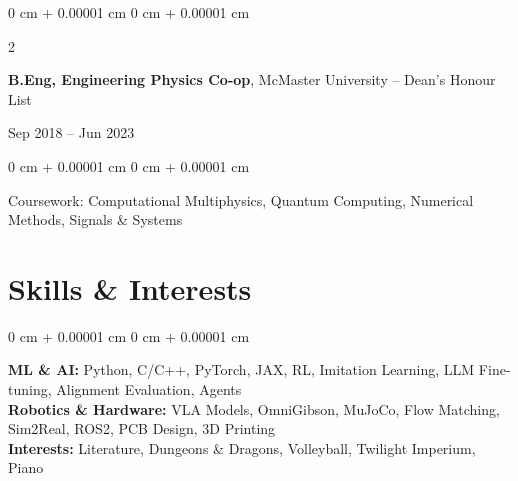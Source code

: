 \documentclass[10pt, letterpaper]{article}
\newenvironment{onecolentry}{
    \begin{adjustwidth}{
        0 cm + 0.00001 cm
    }{
        0 cm + 0.00001 cm
    }
}{
    \end{adjustwidth}
} %
\newenvironment{twocolentry}[2][]{
    \onecolentry
    \def\secondColumn{#2}
    \setcolumnwidth{\fill, 4.5 cm}
    \begin{paracol}{2}
}{
    \switchcolumn \raggedleft \secondColumn
    \end{paracol}
    \endonecolentry
} %
\begin{document}
    \vspace{0.2 cm}
    \begin{twocolentry}{Sep 2018 – Jun 2023}
        \textbf{B.Eng, Engineering Physics Co-op}, McMaster University -- Dean's Honour List
    \end{twocolentry}
    \begin{onecolentry}
        Coursework: Computational Multiphysics, Quantum Computing, Numerical Methods, Signals \& Systems
    \end{onecolentry}

\section{Skills \& Interests}
\begin{onecolentry}
    \textbf{ML \& AI:} Python, C/C++, PyTorch, JAX, RL, Imitation Learning, LLM Fine-tuning, Alignment Evaluation, Agents\\
    \textbf{Robotics \& Hardware:} VLA Models, OmniGibson, MuJoCo, Flow Matching, Sim2Real, ROS2, PCB Design, 3D Printing\\
    \textbf{Interests:} Literature, Dungeons \& Dragons, Volleyball, Twilight Imperium, Piano
\end{onecolentry}
\end{document}
